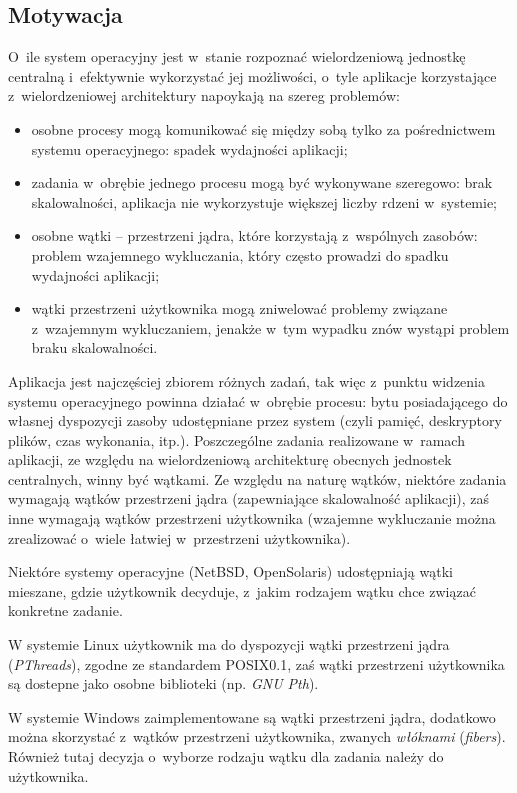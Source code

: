 \subsection{Motywacja}
%
\indent
	O~ile system operacyjny jest w~stanie rozpoznać wielordzeniową jednostkę centralną i~efektywnie wykorzystać jej możliwości,
	o~tyle aplikacje korzystające z~wielordzeniowej architektury napoykają na szereg problemów:
	\begin{itemize}
		\item osobne procesy mogą komunikować się między sobą tylko za pośrednictwem systemu operacyjnego: spadek wydajności aplikacji;
		\item zadania w~obrębie jednego procesu mogą być wykonywane szeregowo: brak skalowalności, aplikacja nie wykorzystuje większej liczby
		rdzeni w~systemie;
		\item osobne wątki -- przestrzeni jądra, które korzystają z~wspólnych zasobów: problem wzajemnego wykluczania, który często prowadzi
		do spadku wydajności aplikacji;
		\item wątki przestrzeni użytkownika mogą zniwelować problemy związane z~wzajemnym wykluczaniem, jenakże w~tym wypadku znów wystąpi
		problem braku skalowalności.
	\end{itemize}
\par
%
\indent
	Aplikacja jest najczęściej zbiorem różnych zadań, tak więc z~punktu widzenia systemu operacyjnego powinna działać w~obrębie procesu: 
	bytu posiadającego do własnej dyspozycji zasoby udostępniane przez system (czyli pamięć, deskryptory plików, czas wykonania, itp.).
	Poszczególne zadania realizowane w~ramach aplikacji, ze względu na wielordzeniową architekturę obecnych jednostek centralnych, winny być wątkami.
	Ze względu na naturę wątków, niektóre zadania wymagają wątków przestrzeni jądra (zapewniające skalowalność aplikacji), zaś inne wymagają
	wątków przestrzeni użytkownika (wzajemne wykluczanie można zrealizować o~wiele łatwiej w~przestrzeni użytkownika).
\par
%
\indent
	Niektóre systemy operacyjne (NetBSD, OpenSolaris) udostępniają wątki mieszane, gdzie użytkownik decyduje, z~jakim rodzajem wątku 
	chce związać konkretne zadanie.
\par
%
\indent
	W systemie Linux użytkownik ma do dyspozycji wątki przestrzeni jądra \linebreak (\emph{PThreads}), zgodne ze standardem POSIX0.1, zaś wątki przestrzeni
	użytkownika są dostepne jako osobne biblioteki (np. \emph{GNU Pth}).
\par
%
\indent
	W systemie Windows zaimplementowane są wątki przestrzeni jądra, dodatkowo można skorzystać z~wątków przestrzeni użytkownika,
	zwanych \emph{włóknami} (\emph{fibers}). Również tutaj decyzja o~wyborze rodzaju wątku dla zadania należy do użytkownika.
\par
%
